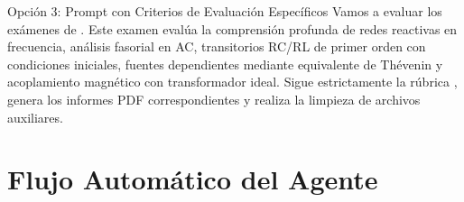 \documentclass[12pt,letterpaper]{article}
\begin{document}
\begin{promptbox}{Opción 3: Prompt con Criterios de Evaluación Específicos}
Vamos a evaluar los exámenes de . Este examen evalúa la comprensión profunda de redes reactivas en frecuencia, análisis fasorial en AC, transitorios RC/RL de primer orden con condiciones iniciales, fuentes dependientes mediante equivalente de Thévenin y acoplamiento magnético con transformador ideal. Sigue estrictamente la rúbrica , genera los informes PDF correspondientes y realiza la limpieza de archivos auxiliares.
\end{promptbox}

\section{Flujo Automático del Agente}
\end{document}
